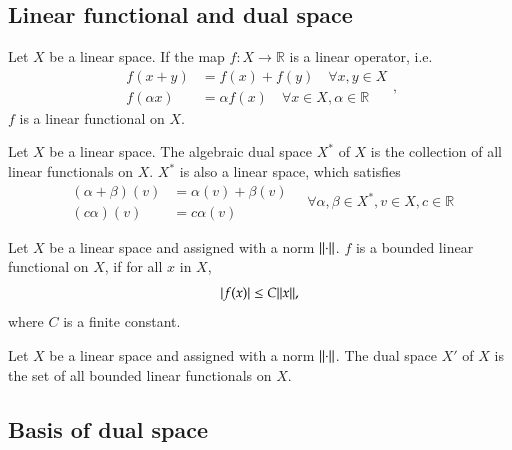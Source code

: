\documentclass[11pt, a4paper]{book}
\begin{document}
\subsection{Linear functional and dual space}

\begin{Definition}
  \label{def:linear-functional}
  Let $X$ be a linear space. If the map $f: X \rightarrow \mathbb{R}$ is a linear
  operator, i.e.
  $$
  \begin{aligned}
    f(x + y) &= f(x) + f(y) \quad \forall x, y \in X \\
    f(\alpha x) &= \alpha f(x) \quad \forall x \in X, \alpha \in \mathbb{R}
  \end{aligned},
  $$
  $f$ is a linear functional on $X$.
\end{Definition}

\begin{Definition}
  \label{def:alg-dual}
  Let $X$ be a linear space. The algebraic dual space $X^{*}$ of $X$ is the collection of
  all linear functionals on $X$. $X^{*}$ is also a linear space, which satisfies
  \begin{equation*}
    \begin{aligned}
      (\alpha+\beta)(v) &= \alpha(v) + \beta(v) \\
      (c\alpha)(v) &= c\alpha(v)
    \end{aligned}
    \quad \forall \alpha,\beta\in X^{*}, v\in X, c\in \mathbb{R}
  \end{equation*}
\end{Definition}

\begin{Definition}
  \label{def:bounded-linear-functional}
  Let $X$ be a linear space and assigned with a norm $\lVert\cdot\rVert$. $f$ is a bounded
  linear functional on $X$, if for all $x$ in $X$,
  $$
  \lvert f(x)\rvert \leq C \lVert x\rVert,
  $$
  where $C$ is a finite constant.
\end{Definition}

\begin{Definition}
  Let $X$ be a linear space and assigned with a norm $\lVert\cdot\rVert$. The dual space $X'$
  of $X$ is the set of all bounded linear functionals on $X$.
\end{Definition}

\subsection{Basis of dual space}
\end{document}
